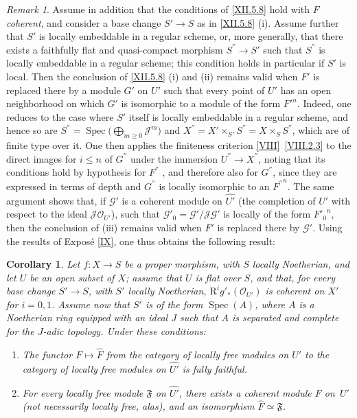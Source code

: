 \documentclass[11pt,a4paper,oneside]{book}
\providecommand{\sisi}[2]{#2}
\providecommand{\pageoriginale}{%
  \refstepcounter{pageoriginal}%
  \marginpar{\raggedright\footnotesize\bfseries\thepageoriginal}%
  \xspace}
\providecommand{\Gg}{\mathcal G}
\providecommand{\Jj}{\mathcal J}
\providecommand{\Oo}{\mathcal O}
\providecommand{\formelF}{\mathfrak F}
\providecommand{\Spec}{\operatorname{Spec}}
\providecommand{\R}{\mathrm R}
\providecommand{\mto}{\longmapsto}
\let\pageoriginaled\pageoriginale
\newenvironment{enumeratei}
  {\begin{enumerate}[label=(\roman*)]}
  {\end{enumerate}}
\theoremstyle{plain}
\newtheorem{corollaire}[subsection]{Corollary}
\theoremstyle{definition}
\theoremstyle{remark}
\newtheorem{remarque}[subsection]{Remark}
\renewcommand{\Ref}[1]{\textup{\ref{#1}}}
\begin{document}
\begin{remarque} \label{XII.5.9}
Assume in addition that the conditions of \Ref{XII.5.8} hold with $F$ \emph{coherent}, and consider a base change $S'\to S$ as in \sisi{\Ref{XII.5.9}}{\Ref{XII.5.8}} (i). Assume further that $S'$ is locally embeddable in a regular scheme, or, more generally, that there exists a faithfully flat and quasi-compact morphism $S^{''}\to \sisi{S}{S'}$ such that $S^{''}$ is locally embeddable in a regular scheme; this condition holds in particular if $S'$ is local. Then the conclusion of \Ref{XII.5.8} (i) and (ii) remains valid when $F'$ is replaced there by a module $G'$ on $U'$ such that every point of $U'$ has an open neighborhood on which $G'$ is isomorphic to a module of the form ${F'}^n$. Indeed, one reduces to the case where $S'$ itself is locally embeddable in a regular scheme, and hence so are $S^{''}=\Spec\big(\sisi{\coprod}{\bigoplus}_{m\geq 0}\Jj^m\big)$ and $X^{''}=X'\times_{S'}S^{''}=X\times_SS^{''}$, which are of finite type over it. One then applies the finiteness criterion \Ref{VIII}~\Ref{VIII.2.3} to the direct images for $i\leq n$ of $G^{''}$ under the immersion $U^{''}\to X^{''}$, noting that its conditions hold by hypothesis for $F^{''}$\pageoriginaled, and therefore also for $G^{''}$, since they are expressed in terms of depth and $G^{''}$ is locally isomorphic to an ${F^{''}}^n$. The same argument shows that, if $\Gg'$ is a coherent module on $\widehat{U'}$ (the completion of $U'$ with respect to the ideal $\Jj\Oo_{U'}$), such that $\Gg'_0=\Gg'/\Jj\Gg'$ is locally of the form $\sisi{F_0^{'n}}{{F'_0}^n}$, then the conclusion of (iii) remains valid when $F'$ is replaced there by $\Gg'$. Using the results of Expos\'e \Ref{IX}, one thus obtains the following result:
\end{remarque}

\begin{corollaire} \label{XII.5.10}
Let $f:X\to S$ be a proper morphism, with $S$ locally Noetherian, and let $U$ be an open subset of $X$; assume that $U$ is flat over $S$, and that, for every base change $S'\to S$, with $S'$ locally Noetherian, $\sisi{R^i}{\R^i}g'_\ast(\Oo_{U'})$ is coherent on $X'$ for $i=0,1$. Assume now that $S'$ is of the form $\Spec(A)$, where $A$ is a Noetherian ring equipped with an ideal $J$ such that $A$ is separated and complete for the $J$-adic topology. Under these conditions:
\begin{enumeratei}
\item
The functor $F\mto\widehat{F}$ from the category of locally free modules on $U'$ to the category of locally free modules on $\widehat{U'}$ is fully faithful.
\item
For every locally free module $\formelF$ on $\widehat{U'}$, there exists a coherent module $F$ on~$U'$ (not necessarily locally free, alas), and an isomorphism $\widehat{F}\simeq\formelF$.
\end{enumeratei}
\end{corollaire}
\end{document}
